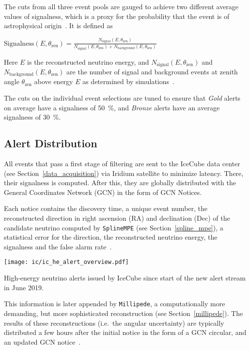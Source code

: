 The cuts from all three event pools are gauged to achieve two different average values of signalness, which is a proxy for the probability that the event is of astrophysical origin~\cite{Abbasi2023}. It is defined as
\begin{definition}\label{signalness_def}
    $\text{Signalness}(E,\theta_\text{zen}) = \frac{N_\text{signal}(E,\theta_\text{zen})}{N_\text{signal}(E,\theta_\text{zen})+N_\text{background}(E,\theta_\text{zen})}$
\end{definition}
Here $E$ is the reconstructed neutrino energy, and $N_\text{signal}(E,\theta_\text{zen})$ and $N_\text{background}(E,\theta_\text{zen})$ are the number of signal and background events at zenith angle $\theta_\text{zen}$ above energy $E$ as determined by simulations~\cite{Abbasi2023}.

The cuts on the individual event selections are tuned to ensure that \textit{Gold} alerts on average have a signalness of \SI{50}{\percent}, and \textit{Bronze} alerts have an average signalness of \SI{30}{\percent}.

\subsection{Alert Distribution} \label{ic_alerts}
All events that pass a first stage of filtering are sent to the IceCube data center (see Section~\ref{data_acquisition}) via Iridium satellite to minimize latency. There, their signalness is computed. After this, they are globally distributed with the General Coordinates Network (GCN) in the form of GCN Notices.

Each notice contains the discovery time, a unique event number, the reconstructed direction in right ascension (RA) and declination (Dec) of the candidate neutrino computed by \texttt{SplineMPE} (see Section~\ref{spline_mpe}), a statistical error for the direction, the reconstructed neutrino energy, the signalness and the false alarm rate~\cite{Blaufuss2019}.

\begin{marginfigure}
    \texttt{[image: ic/ic\_he\_alert\_overview.pdf]}
    \caption[IceCube alert overview]{High-energy neutrino alerts issued by IceCube since start of the new alert stream in June 2019.}
\end{marginfigure}

This information is later appended by \texttt{Millipede}, a computationally more demanding, but more sophisticated reconstruction (see Section~\ref{millipede}). The results of these reconstructions (i.e.\ the angular uncertainty) are typically distributed a few hours after the initial notice in the form of a GCN circular, and an updated GCN notice~\cite{Blaufuss2019}.

